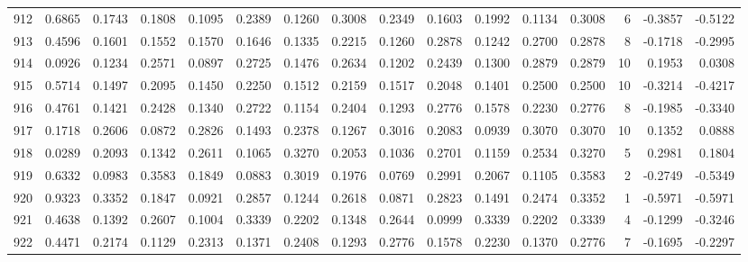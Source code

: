 \begin{tabular}{lrrrrrrrrrrrrrrr}
912 &      0.6865 &  0.1743 &  0.1808 &  0.1095 &  0.2389 &  0.1260 &  0.3008 &  0.2349 &  0.1603 &  0.1992 &   0.1134 &     0.3008 &      6 &                   -0.3857 &                    -0.5122 \\
913 &      0.4596 &  0.1601 &  0.1552 &  0.1570 &  0.1646 &  0.1335 &  0.2215 &  0.1260 &  0.2878 &  0.1242 &   0.2700 &     0.2878 &      8 &                   -0.1718 &                    -0.2995 \\
914 &      0.0926 &  0.1234 &  0.2571 &  0.0897 &  0.2725 &  0.1476 &  0.2634 &  0.1202 &  0.2439 &  0.1300 &   0.2879 &     0.2879 &     10 &                    0.1953 &                     0.0308 \\
915 &      0.5714 &  0.1497 &  0.2095 &  0.1450 &  0.2250 &  0.1512 &  0.2159 &  0.1517 &  0.2048 &  0.1401 &   0.2500 &     0.2500 &     10 &                   -0.3214 &                    -0.4217 \\
916 &      0.4761 &  0.1421 &  0.2428 &  0.1340 &  0.2722 &  0.1154 &  0.2404 &  0.1293 &  0.2776 &  0.1578 &   0.2230 &     0.2776 &      8 &                   -0.1985 &                    -0.3340 \\
917 &      0.1718 &  0.2606 &  0.0872 &  0.2826 &  0.1493 &  0.2378 &  0.1267 &  0.3016 &  0.2083 &  0.0939 &   0.3070 &     0.3070 &     10 &                    0.1352 &                     0.0888 \\
918 &      0.0289 &  0.2093 &  0.1342 &  0.2611 &  0.1065 &  0.3270 &  0.2053 &  0.1036 &  0.2701 &  0.1159 &   0.2534 &     0.3270 &      5 &                    0.2981 &                     0.1804 \\
919 &      0.6332 &  0.0983 &  0.3583 &  0.1849 &  0.0883 &  0.3019 &  0.1976 &  0.0769 &  0.2991 &  0.2067 &   0.1105 &     0.3583 &      2 &                   -0.2749 &                    -0.5349 \\
920 &      0.9323 &  0.3352 &  0.1847 &  0.0921 &  0.2857 &  0.1244 &  0.2618 &  0.0871 &  0.2823 &  0.1491 &   0.2474 &     0.3352 &      1 &                   -0.5971 &                    -0.5971 \\
921 &      0.4638 &  0.1392 &  0.2607 &  0.1004 &  0.3339 &  0.2202 &  0.1348 &  0.2644 &  0.0999 &  0.3339 &   0.2202 &     0.3339 &      4 &                   -0.1299 &                    -0.3246 \\
922 &      0.4471 &  0.2174 &  0.1129 &  0.2313 &  0.1371 &  0.2408 &  0.1293 &  0.2776 &  0.1578 &  0.2230 &   0.1370 &     0.2776 &      7 &                   -0.1695 &                    -0.2297 \\

\end{tabular}
